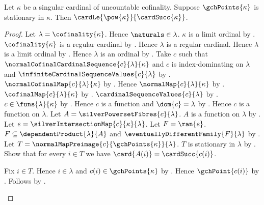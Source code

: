 \begin{theorem}\label{silver_powerset_upper_bound}
    Let $\kappa$ be a singular cardinal of uncountable cofinality.
    Suppose $\gchPoints{\kappa}$ is stationary in $\kappa$.
    Then $\cardLe{\pow{\kappa}}{\cardSucc{\kappa}}$.
\end{theorem}
\begin{proof}
    Let $\lambda=\cofinality{\kappa}$.
    Hence $\naturals\in\lambda$.
    $\kappa$ is a limit ordinal
        by .
    $\cofinality{\kappa}$ is a regular cardinal
        by .
    Hence $\lambda$ is a regular cardinal.
    Hence $\lambda$ is a limit ordinal
        by .
    Hence $\lambda$ is an ordinal by .
    Take $c$ such that
        $\normalCofinalCardinalSequence{c}{\lambda}{\kappa}$ and
        $c$ is index-dominating on $\lambda$ and
        $\infiniteCardinalSequenceValues{c}{\lambda}$
        by .
    $\normalCofinalMap{c}{\lambda}{\kappa}$
        by .
    Hence $\normalMap{c}{\lambda}{\kappa}$
        by .
    $\cofinalMap{c}{\lambda}{\kappa}$
        by .
    $\cardinalSequenceValues{c}{\lambda}$
        by .
    $c\in\funs{\lambda}{\kappa}$ by .
    Hence $c$ is a function and $\dom{c}=\lambda$
        by .
    Hence $c$ is a function on $\lambda$.
    Let $A=\silverPowersetFibres{c}{\lambda}$.
    $A$ is a function on $\lambda$
        by .
    Let $e=\silverIntersectionMap{c}{\kappa}{\lambda}$.
    Let $F=\ran{e}$.
    $F\subseteq\dependentProduct{\lambda}{A}$ and
        $\eventuallyDifferentFamily{F}{\lambda}$
        by .
    Let $T=\normalMapPreimage{c}{\gchPoints{\kappa}}{\lambda}$.
    $T$ is stationary in $\lambda$
        by .
    Show that for every $i\in T$ we have
        $\card{A(i)}=\cardSucc{c(i)}$.
    \begin{subproof}
        Fix $i\in T$.
        Hence $i\in\lambda$ and $c(i)\in\gchPoints{\kappa}$
            by .
        Hence $\gchPoint{c(i)}$ by .
        Follows by .

\end{subproof}
\end{proof}
